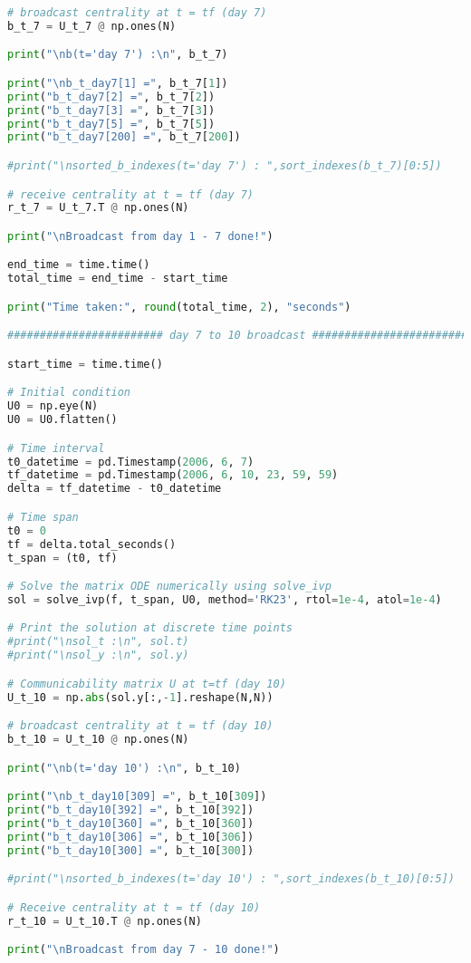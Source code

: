 \begin{lstlisting}[language=Python, caption=Voice call experiment]
# broadcast centrality at t = tf (day 7)
b_t_7 = U_t_7 @ np.ones(N)

print("\nb(t='day 7') :\n", b_t_7)

print("\nb_t_day7[1] =", b_t_7[1])
print("b_t_day7[2] =", b_t_7[2])
print("b_t_day7[3] =", b_t_7[3])
print("b_t_day7[5] =", b_t_7[5])
print("b_t_day7[200] =", b_t_7[200])

#print("\nsorted_b_indexes(t='day 7') : ",sort_indexes(b_t_7)[0:5])

# receive centrality at t = tf (day 7)
r_t_7 = U_t_7.T @ np.ones(N)

print("\nBroadcast from day 1 - 7 done!")

end_time = time.time()
total_time = end_time - start_time

print("Time taken:", round(total_time, 2), "seconds")

######################## day 7 to 10 broadcast #########################

start_time = time.time()

# Initial condition 
U0 = np.eye(N)
U0 = U0.flatten()

# Time interval
t0_datetime = pd.Timestamp(2006, 6, 7)
tf_datetime = pd.Timestamp(2006, 6, 10, 23, 59, 59)
delta = tf_datetime - t0_datetime 

# Time span
t0 = 0
tf = delta.total_seconds()
t_span = (t0, tf) 

# Solve the matrix ODE numerically using solve_ivp
sol = solve_ivp(f, t_span, U0, method='RK23', rtol=1e-4, atol=1e-4)

# Print the solution at discrete time points
#print("\nsol_t :\n", sol.t)
#print("\nsol_y :\n", sol.y)

# Communicability matrix U at t=tf (day 10)
U_t_10 = np.abs(sol.y[:,-1].reshape(N,N))

# broadcast centrality at t = tf (day 10)
b_t_10 = U_t_10 @ np.ones(N)

print("\nb(t='day 10') :\n", b_t_10)

print("\nb_t_day10[309] =", b_t_10[309])
print("b_t_day10[392] =", b_t_10[392])
print("b_t_day10[360] =", b_t_10[360])
print("b_t_day10[306] =", b_t_10[306])
print("b_t_day10[300] =", b_t_10[300])

#print("\nsorted_b_indexes(t='day 10') : ",sort_indexes(b_t_10)[0:5])

# Receive centrality at t = tf (day 10)
r_t_10 = U_t_10.T @ np.ones(N)

print("\nBroadcast from day 7 - 10 done!")


\end{lstlisting}

